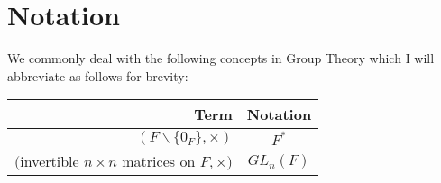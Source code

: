 \section{Notation}

We commonly deal with the following concepts in Group Theory
which I will abbreviate as follows for brevity:
\begin{center}
    \begin{tabular}{ | r | c | }
        \hline
        Term & Notation \\
        \hline \hline
        $(F \backslash \{0_F\}, \times)$ & $F^*$ \\
        $($invertible $n \times n$ matrices on $F$,$\,\times)$ & $GL_n(F)$ \\
        \hline
    \end{tabular}
\end{center}